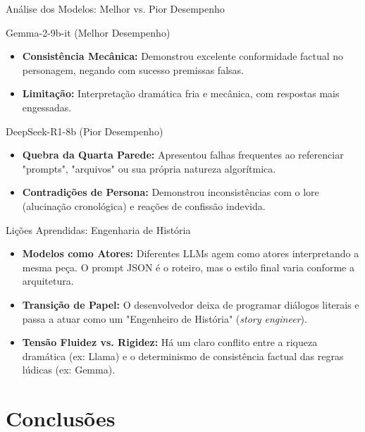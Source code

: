 \documentclass[11pt]{beamer}
\begin{document}
\begin{frame}{Análise dos Modelos: Melhor vs. Pior Desempenho}
\begin{block}{Gemma-2-9b-it (Melhor Desempenho)}
    \begin{itemize}
        \item \textbf{Consistência Mecânica:} Demonstrou excelente conformidade factual no personagem, negando com sucesso premissas falsas.
        \item \textbf{Limitação:} Interpretação dramática fria e mecânica, com respostas mais engessadas.
    \end{itemize}
\end{block}
\begin{block}{DeepSeek-R1-8b (Pior Desempenho)}
    \begin{itemize}
        \item \textbf{Quebra da Quarta Parede:} Apresentou falhas frequentes ao referenciar "prompts", "arquivos" ou sua própria natureza algorítmica.
        \item \textbf{Contradições de Persona:} Demonstrou inconsistências com o lore (alucinação cronológica) e reações de confissão indevida.
    \end{itemize}
\end{block}
\end{frame}

\begin{frame}{Lições Aprendidas: Engenharia de História}
\begin{itemize}
    \item \textbf{Modelos como Atores:} Diferentes LLMs agem como atores interpretando a mesma peça. O prompt JSON é o roteiro, mas o estilo final varia conforme a arquitetura.
    \item \textbf{Transição de Papel:} O desenvolvedor deixa de programar diálogos literais e passa a atuar como um "Engenheiro de História" (\textit{story engineer}).
    \item \textbf{Tensão Fluidez vs. Rigidez:} Há um claro conflito entre a riqueza dramática (ex: Llama) e o determinismo de consistência factual das regras lúdicas (ex: Gemma).
\end{itemize}
\end{frame}

\section{Conclusões}
\end{document}
